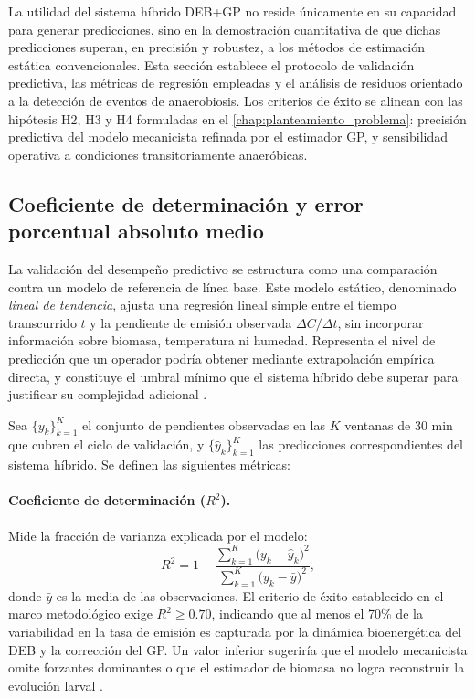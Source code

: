 La utilidad del sistema híbrido DEB+GP no reside únicamente en su capacidad para generar predicciones, sino en la demostración cuantitativa de que dichas predicciones superan, en precisión y robustez, a los métodos de estimación estática convencionales. Esta sección establece el protocolo de validación predictiva, las métricas de regresión empleadas y el análisis de residuos orientado a la detección de eventos de anaerobiosis. Los criterios de éxito se alinean con las hipótesis H2, H3 y H4 formuladas en el \cref{chap:planteamiento_problema}: precisión predictiva del modelo mecanicista refinada por el estimador GP, y sensibilidad operativa a condiciones transitoriamente anaeróbicas.

\subsection{Coeficiente de determinación y error porcentual absoluto medio}
\label{subsec:cap4_metricas_regresion}

La validación del desempeño predictivo se estructura como una comparación contra un modelo de referencia de línea base. Este modelo estático, denominado \emph{lineal de tendencia}, ajusta una regresión lineal simple entre el tiempo transcurrido $t$ y la pendiente de emisión observada $\Delta C/\Delta t$, sin incorporar información sobre biomasa, temperatura ni humedad. Representa el nivel de predicción que un operador podría obtener mediante extrapolación empírica directa, y constituye el umbral mínimo que el sistema híbrido debe superar para justificar su complejidad adicional \parencite{weichertReviewMachineLearning2019}.

Sea $\{y_k\}_{k=1}^{K}$ el conjunto de pendientes observadas en las $K$ ventanas de \num{30} min que cubren el ciclo de validación, y $\{\hat{y}_k\}_{k=1}^{K}$ las predicciones correspondientes del sistema híbrido. Se definen las siguientes métricas:

\paragraph{Coeficiente de determinación ($R^2$).}
Mide la fracción de varianza explicada por el modelo:
\begin{equation}
    \label{eq:cap4_r2_definicion}
    R^{2} = 1 - \frac{\sum_{k=1}^{K}\bigl(y_k - \hat{y}_k\bigr)^{2}}
    {\sum_{k=1}^{K}\bigl(y_k - \bar{y}\bigr)^{2}},
\end{equation}
donde $\bar{y}$ es la media de las observaciones. El criterio de éxito establecido en el marco metodológico exige $R^{2} \geq \num{0.70}$, indicando que al menos el \num{70}\% de la variabilidad en la tasa de emisión es capturada por la dinámica bioenergética del DEB y la corrección del GP. Un valor inferior sugeriría que el modelo mecanicista omite forzantes dominantes o que el estimador de biomasa no logra reconstruir la evolución larval \parencite{eriksenDynamicModellingFeed2022}.

